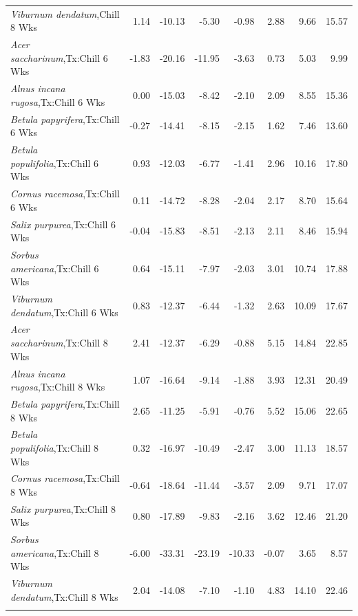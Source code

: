 \documentclass{article}\usepackage[]{graphicx}\usepackage[]{color}
\begin{document}
\begin{longtable}{lrrrrrrr}
  \textit{Viburnum dendatum},Chill 8 Wks & 1.14 & -10.13 & -5.30 & -0.98 & 2.88 & 9.66 & 15.57 \\ 
  \textit{Acer saccharinum},Tx:Chill 6 Wks & -1.83 & -20.16 & -11.95 & -3.63 & 0.73 & 5.03 & 9.99 \\ 
  \textit{Alnus incana rugosa},Tx:Chill 6 Wks & 0.00 & -15.03 & -8.42 & -2.10 & 2.09 & 8.55 & 15.36 \\ 
  \textit{Betula papyrifera},Tx:Chill 6 Wks & -0.27 & -14.41 & -8.15 & -2.15 & 1.62 & 7.46 & 13.60 \\ 
  \textit{Betula populifolia},Tx:Chill 6 Wks & 0.93 & -12.03 & -6.77 & -1.41 & 2.96 & 10.16 & 17.80 \\ 
  \textit{Cornus racemosa},Tx:Chill 6 Wks & 0.11 & -14.72 & -8.28 & -2.04 & 2.17 & 8.70 & 15.64 \\ 
  \textit{Salix purpurea},Tx:Chill 6 Wks & -0.04 & -15.83 & -8.51 & -2.13 & 2.11 & 8.46 & 15.94 \\ 
  \textit{Sorbus americana},Tx:Chill 6 Wks & 0.64 & -15.11 & -7.97 & -2.03 & 3.01 & 10.74 & 17.88 \\ 
  \textit{Viburnum dendatum},Tx:Chill 6 Wks & 0.83 & -12.37 & -6.44 & -1.32 & 2.63 & 10.09 & 17.67 \\ 
  \textit{Acer saccharinum},Tx:Chill 8 Wks & 2.41 & -12.37 & -6.29 & -0.88 & 5.15 & 14.84 & 22.85 \\ 
  \textit{Alnus incana rugosa},Tx:Chill 8 Wks & 1.07 & -16.64 & -9.14 & -1.88 & 3.93 & 12.31 & 20.49 \\ 
  \textit{Betula papyrifera},Tx:Chill 8 Wks & 2.65 & -11.25 & -5.91 & -0.76 & 5.52 & 15.06 & 22.65 \\ 
  \textit{Betula populifolia},Tx:Chill 8 Wks & 0.32 & -16.97 & -10.49 & -2.47 & 3.00 & 11.13 & 18.57 \\ 
  \textit{Cornus racemosa},Tx:Chill 8 Wks & -0.64 & -18.64 & -11.44 & -3.57 & 2.09 & 9.71 & 17.07 \\ 
  \textit{Salix purpurea},Tx:Chill 8 Wks & 0.80 & -17.89 & -9.83 & -2.16 & 3.62 & 12.46 & 21.20 \\ 
  \textit{Sorbus americana},Tx:Chill 8 Wks & -6.00 & -33.31 & -23.19 & -10.33 & -0.07 & 3.65 & 8.57 \\ 
  \textit{Viburnum dendatum},Tx:Chill 8 Wks & 2.04 & -14.08 & -7.10 & -1.10 & 4.83 & 14.10 & 22.46 \\ 
   \hline
\hline
\label{tab:suppmodgs}
\end{longtable}
\end{document}
